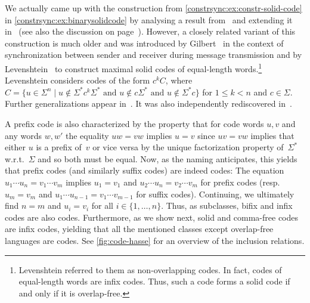 \begin{remark}		
	We actually came up with the construction from \cref{constrsync:ex:constr-solid-code}
	in \cref{constrsync:ex:binarysolidcode} by analysing
	a result from~\cite[Thm.~29]{FernauGHHVW19}
	and extending it in~\cite[Thm.~17]{DBLP:conf/fct/Hoffmann21} (see also the discussion on page~\pageref{discussion:strongly-self-sync-codes}).	
	However, a closely related variant of this construction is much older and was introduced 
	by Gilbert~\cite{Gilbert1960Synchronization} in the context of synchronization between sender and receiver during message transmission
	and by Levenshtein~\cite{Lev64,levenshtein1970maximum_en} 
	to construct maximal solid codes of equal-length words.\footnote{Levenshtein referred to them as non-overlapping codes. In fact, 
		codes of equal-length words
		are infix codes. Thus, such a code forms a solid code if and only if it is overlap-free.}
	Levenshtein considers codes of the form $c^k C$, where
	$C = \{ u \in \Sigma^{n} \mid u \notin \Sigma^* c^k \Sigma^* \text{ and } u \notin c\Sigma^* \text{ and } u \notin \Sigma^* c \}$
	for $1 \le k < n$ and $c \in \Sigma$.
	Further generalizations appear in~\cite[Construction~2]{Blackburn2015NonOverlappingCodes}. It was also independently rediscovered in~\cite{CheeKiahPurkayasthaWang2013}.
\end{remark}

A prefix code is also characterized by the property
that for code words $u,v$ and any words $w,w'$
the equality $uw = vw$ implies $u = v$
since $uv = vw$ implies that either $u$ is a prefix of~$v$
or vice versa by the unique factorization property of~$\Sigma^*$
w.r.t.~$\Sigma$ and so both must be equal.
Now, as the naming anticipates, this yields that prefix 
codes (and similarly suffix codes) are indeed codes: The equation $u_1 \cdots u_n = v_1 \cdots v_m$ implies
$u_1 = v_1$ and $u_2 \cdots u_n = v_2 \cdots v_m$ for prefix codes (resp.~$u_m = v_m$ and $u_1 \cdots u_{n-1} = v_1 \cdots v_{m-1}$ for suffix codes).
Continuing, we ultimately find $n = m$ and $u_i = v_i$ 
for all $i \in \{1,\ldots,n\}$. 
Thus, as subclasses, bifix and infix codes are also codes.
Furthermore, as we show next, solid and comma-free codes are infix codes,
yielding that all the mentioned classes except overlap-free languages
are codes. See \cref{fig:code-hasse} for an overview of the inclusion relations.

